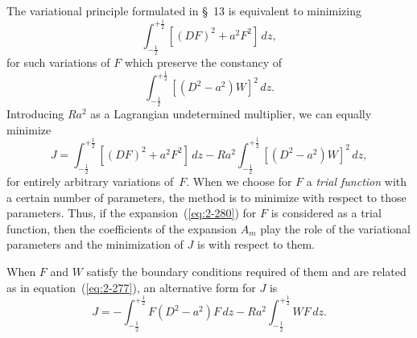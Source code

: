 The variational principle formulated in \S~13 is equivalent to minimizing
\begin{equation}
\label{eq:2-285}
\int_{-\frac{1}{2}}^{+\frac{1}{2}} [(DF)^2 + a^2 F^2]\,dz,
\end{equation}
for such variations of $F$ which preserve the constancy of
\begin{equation}
\label{eq:2-286}
\int_{-\frac{1}{2}}^{+\frac{1}{2}} [(D^2 - a^2)W]^2\,dz.
\end{equation}
Introducing $Ra^2$ as a Lagrangian undetermined multiplier, we can
equally minimize
\begin{equation}
\label{eq:2-287}
J = \int_{-\frac{1}{2}}^{+\frac{1}{2}} [(DF)^2 + a^2 F^2]\,dz - Ra^2 \int_{-\frac{1}{2}}^{+\frac{1}{2}} [(D^2 - a^2)W]^2\,dz,
\end{equation}
for entirely arbitrary variations of~$F$. When we choose for $F$ a \emph{trial
function} with a certain number of parameters, the method is to minimize
with respect to those parameters. Thus, if the expansion~(\ref{eq:2-280}) for $F$
is considered as a trial function, then the coefficients of the expansion
$A_m$ play the role of the variational parameters and the minimization of
$J$ is with respect to them.

When $F$ and $W$ satisfy the boundary conditions required of them and
are related as in equation~(\ref{eq:2-277}), an alternative form for $J$ is
\begin{equation}
\label{eq:2-288}
J = -\int_{-\frac{1}{2}}^{+\frac{1}{2}} F(D^2 - a^2)F\,dz - Ra^2 \int_{-\frac{1}{2}}^{+\frac{1}{2}} WF\,dz.
\end{equation}

